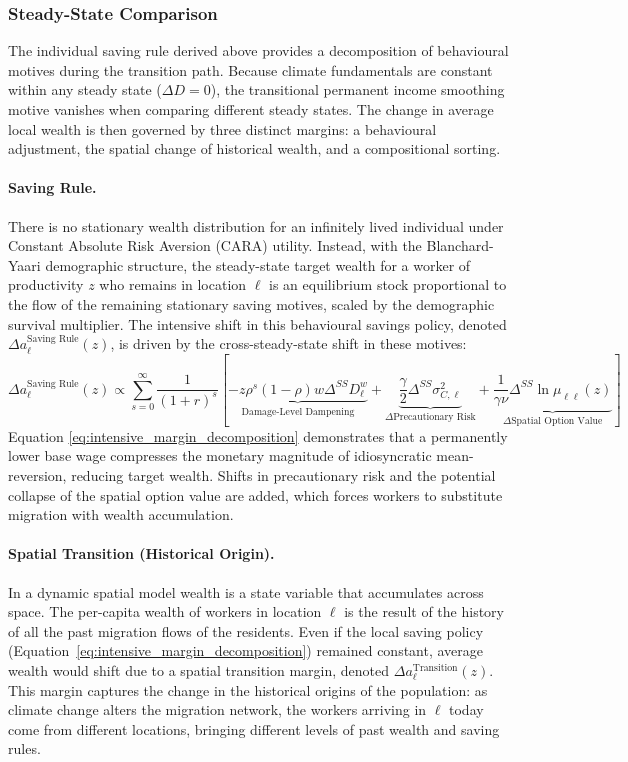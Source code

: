 \documentclass[12pt, a4paper]{article}
\begin{document}
\subsubsection*{Steady-State Comparison}
The individual saving rule derived above provides a decomposition of behavioural motives during the transition path. Because climate fundamentals are constant within any steady state ($\Delta D = 0$), the transitional permanent income smoothing motive vanishes when comparing different steady states. The change in average local wealth is then governed by three distinct margins: a behavioural adjustment, the spatial change of historical wealth, and a compositional sorting.
\paragraph{Saving Rule.} There is no stationary wealth distribution for an infinitely lived individual under Constant Absolute Risk Aversion (CARA) utility. Instead, with the Blanchard-Yaari demographic structure, the steady-state target wealth for a worker of productivity $z$ who remains in location $\ell$ is an equilibrium stock proportional to the flow of the remaining stationary saving motives, scaled by the demographic survival multiplier. The intensive shift in this behavioural savings policy, denoted $\Delta a_\ell^{\text{Saving Rule}}(z)$, is driven by the cross-steady-state shift in these motives:
\begin{equation}
    \Delta a_\ell^{\text{Saving Rule}}(z) \propto \sum_{s=0}^{\infty} \frac{1}{(1+r)^s} \left[ \underbrace{- z \rho^s (1-\rho) w \Delta^{SS} D^w_\ell}_{\text{Damage-Level Dampening}} + \underbrace{\frac{\gamma}{2} \Delta^{SS} \sigma_{C, \ell}^2}_{\Delta \text{Precautionary Risk}} + \underbrace{\frac{1}{\gamma \nu} \Delta^{SS} \ln \mu_{\ell \ell}(z)}_{\Delta \text{Spatial Option Value}} \right]
    \label{eq:intensive_margin_decomposition}
\end{equation}
Equation \ref{eq:intensive_margin_decomposition} demonstrates that a permanently lower base wage compresses the monetary magnitude of idiosyncratic mean-reversion, reducing target wealth. Shifts in precautionary risk and the potential collapse of the spatial option value are added, which forces workers to substitute migration with wealth accumulation.
\paragraph{Spatial Transition (Historical Origin).}
In a dynamic spatial model wealth is a state variable that accumulates across space. The per-capita wealth of workers in location $\ell$ is the result of the history of all the past migration flows of the residents. Even if the local saving policy (Equation~\ref{eq:intensive_margin_decomposition}) remained constant, average wealth would shift due to a spatial transition margin, denoted $\Delta a_\ell^{\text{Transition}}(z)$. This margin captures the change in the historical origins of the population: as climate change alters the migration network, the workers arriving in $\ell$ today come from different locations, bringing different levels of past wealth and saving rules.
\end{document}
